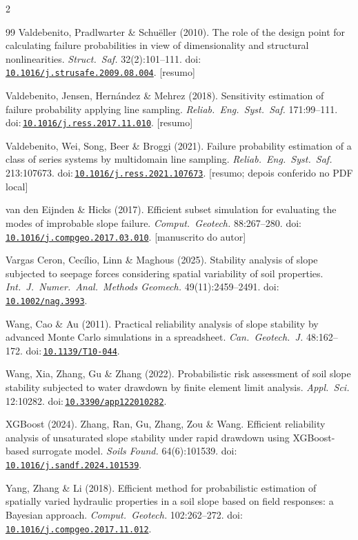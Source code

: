 \documentclass[11pt,a4paper]{article}
\newcommand{\doi}[1]{doi:\,\href{https://doi.org/#1}{\nolinkurl{#1}}}
\begin{document}
\begin{multicols}{2}
\begin{thebibliography}{99}
 Valdebenito, Pradlwarter \& Schuëller (2010). The role of the design
point for calculating failure probabilities in view of dimensionality and structural nonlinearities. \emph{Struct.\
Saf.} 32(2):101--111. \doi{10.1016/j.strusafe.2009.08.004}. [resumo]

 Valdebenito, Jensen, Hernández \& Mehrez (2018). Sensitivity
estimation of failure probability applying line sampling. \emph{Reliab.\ Eng.\ Syst.\ Saf.} 171:99--111.
\doi{10.1016/j.ress.2017.11.010}. [resumo]

 Valdebenito, Wei, Song, Beer \& Broggi (2021). Failure probability
estimation of a class of series systems by multidomain line sampling. \emph{Reliab.\ Eng.\ Syst.\ Saf.} 213:107673.
\doi{10.1016/j.ress.2021.107673}. [resumo; depois conferido no PDF local]

 van den Eijnden \& Hicks (2017). Efficient subset simulation
for evaluating the modes of improbable slope failure. \emph{Comput.\ Geotech.} 88:267--280.
\doi{10.1016/j.compgeo.2017.03.010}. [manuscrito do autor]

 Vargas Ceron, Cecílio, Linn \& Maghous (2025). Stability analysis
of slope subjected to seepage forces considering spatial variability of soil properties. \emph{Int.\ J.\ Numer.\ Anal.\
Methods Geomech.} 49(11):2459--2491. \doi{10.1002/nag.3993}.

 Wang, Cao \& Au (2011). Practical reliability analysis of slope stability by
advanced Monte Carlo simulations in a spreadsheet. \emph{Can.\ Geotech.\ J.} 48:162--172. \doi{10.1139/T10-044}.

\bibitem[Wang et~al.(2022)]{wang2022} Wang, Xia, Zhang, Gu \& Zhang (2022). Probabilistic risk assessment of soil slope
stability subjected to water drawdown by finite element limit analysis. \emph{Appl.\ Sci.} 12:10282.
\doi{10.3390/app122010282}.

 XGBoost (2024). Zhang, Ran, Gu, Zhang, Zou \& Wang. Efficient reliability
analysis of unsaturated slope stability under rapid drawdown using XGBoost-based surrogate model. \emph{Soils Found.}
64(6):101539. \doi{10.1016/j.sandf.2024.101539}.

 Yang, Zhang \& Li (2018). Efficient method for probabilistic estimation of
spatially varied hydraulic properties in a soil slope based on field responses: a Bayesian approach. \emph{Comput.\
Geotech.} 102:262--272. \doi{10.1016/j.compgeo.2017.11.012}.


\end{thebibliography}
\end{multicols}
\end{document}
